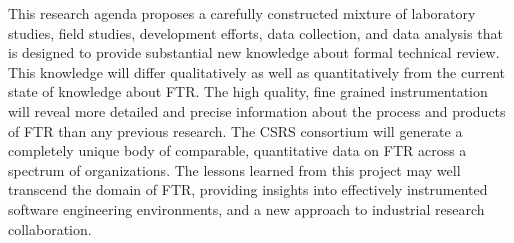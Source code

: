 This research agenda proposes a carefully constructed mixture of laboratory
studies, field studies, development efforts, data collection, and data
analysis that is designed to provide substantial new knowledge about formal
technical review.  This knowledge will differ qualitatively as well as
quantitatively from the current state of knowledge about FTR.  The high
quality, fine grained instrumentation will reveal more detailed and precise
information about the process and products of FTR than any previous
research.  The CSRS consortium will generate a completely unique body of
comparable, quantitative data on FTR across a spectrum of organizations.
The lessons learned from this project may well transcend the domain of FTR,
providing insights into effectively instrumented software engineering
environments, and a new approach to industrial research collaboration.






